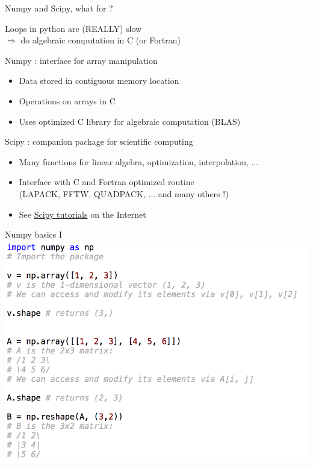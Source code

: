 \documentclass[11pt,unknownkeysallowed,usenames,dvipsnames]{beamer}
\begin{document}
\begin{frame}{Numpy and Scipy, what for ?}
	\begin{center}
        Loops in python are (REALLY) slow\\
        $\Rightarrow$ do algebraic computation in C (or Fortran)
    \end{center}
    \begin{block}{Numpy : interface for array manipulation}
        \begin{itemize}
            \item Data stored in contiguous memory location
            \item Operations on arrays in C
            \item Uses optimized C library for algebraic computation (BLAS)
        \end{itemize}
    \end{block}
    \begin{block}{Scipy : companion package for scientific computing}
        \begin{itemize}
            \item Many functions for linear algebra, optimization, interpolation, ...
            \item Interface with C and Fortran optimized routine\\
            (LAPACK, FFTW, QUADPACK, ... and many others !)
            \item See \href{https://docs.scipy.org/doc/scipy/reference/tutorial/}{Scipy tutorials} on the Internet
        \end{itemize}
    \end{block}
\end{frame}

\begin{frame}{Numpy basics I}
\includegraphics[width=0.9\linewidth]{code-numpy1}
\end{frame}
\end{document}
